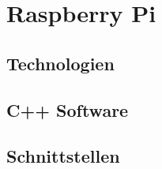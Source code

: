 \section{Raspberry Pi}
\begin{frame}

\end{frame}

\subsection{Technologien}
\begin{frame}

\end{frame}

\subsection{C++ Software}
\begin{frame}

\end{frame}

\subsection{Schnittstellen}
\begin{frame}

\end{frame}